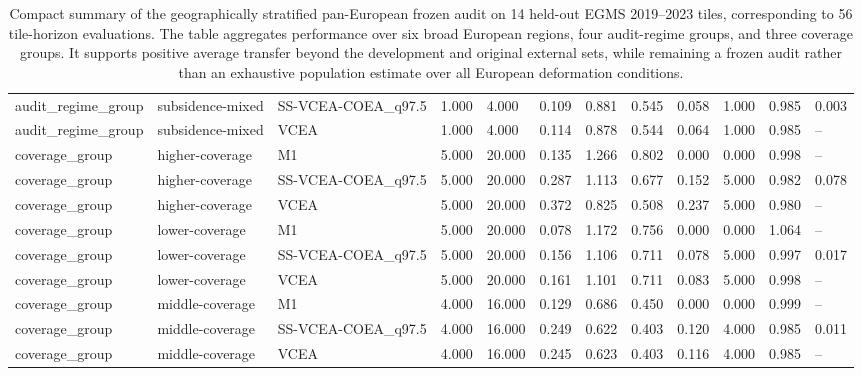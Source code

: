 \begin{table}[t]
\begin{tabular}{llllllllllll}
audit\_regime\_group & subsidence-mixed & SS-VCEA-COEA\_q97.5 & 1.000 & 4.000 & 0.109 & 0.881 & 0.545 & 0.058 & 1.000 & 0.985 & 0.003 \\
audit\_regime\_group & subsidence-mixed & VCEA & 1.000 & 4.000 & 0.114 & 0.878 & 0.544 & 0.064 & 1.000 & 0.985 & -- \\
coverage\_group & higher-coverage & M1 & 5.000 & 20.000 & 0.135 & 1.266 & 0.802 & 0.000 & 0.000 & 0.998 & -- \\
coverage\_group & higher-coverage & SS-VCEA-COEA\_q97.5 & 5.000 & 20.000 & 0.287 & 1.113 & 0.677 & 0.152 & 5.000 & 0.982 & 0.078 \\
coverage\_group & higher-coverage & VCEA & 5.000 & 20.000 & 0.372 & 0.825 & 0.508 & 0.237 & 5.000 & 0.980 & -- \\
coverage\_group & lower-coverage & M1 & 5.000 & 20.000 & 0.078 & 1.172 & 0.756 & 0.000 & 0.000 & 1.064 & -- \\
coverage\_group & lower-coverage & SS-VCEA-COEA\_q97.5 & 5.000 & 20.000 & 0.156 & 1.106 & 0.711 & 0.078 & 5.000 & 0.997 & 0.017 \\
coverage\_group & lower-coverage & VCEA & 5.000 & 20.000 & 0.161 & 1.101 & 0.711 & 0.083 & 5.000 & 0.998 & -- \\
coverage\_group & middle-coverage & M1 & 4.000 & 16.000 & 0.129 & 0.686 & 0.450 & 0.000 & 0.000 & 0.999 & -- \\
coverage\_group & middle-coverage & SS-VCEA-COEA\_q97.5 & 4.000 & 16.000 & 0.249 & 0.622 & 0.403 & 0.120 & 4.000 & 0.985 & 0.011 \\
coverage\_group & middle-coverage & VCEA & 4.000 & 16.000 & 0.245 & 0.623 & 0.403 & 0.116 & 4.000 & 0.985 & -- \\
\bottomrule
\end{tabular}
\caption{Compact summary of the geographically stratified pan-European frozen audit on 14 held-out EGMS 2019--2023 tiles, corresponding to 56 tile-horizon evaluations. The table aggregates performance over six broad European regions, four audit-regime groups, and three coverage groups. It supports positive average transfer beyond the development and original external sets, while remaining a frozen audit rather than an exhaustive population estimate over all European deformation conditions.}
\label{tab:e7_strong_group_summary}
\end{table}
